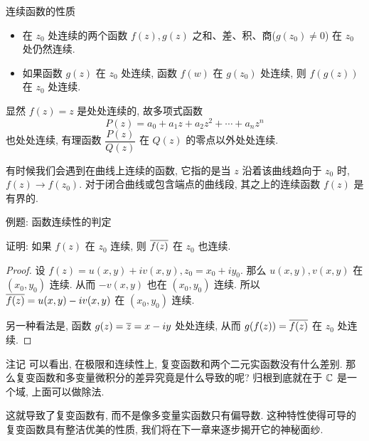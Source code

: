 \begin{frame}{连续函数的性质}
\begin{theorem}
\begin{itemize}
\item 在 $z_0$ 处连续的两个函数 $f(z),g(z)$ 之和、差、积、商($g(z_0)\neq 0$) 在 $z_0$ 处仍然连续.
\item 如果函数 $g(z)$ 在 $z_0$ 处连续, 函数 $f(w)$ 在 $g(z_0)$ 处连续, 则 $f(g(z))$ 在 $z_0$ 处连续.
\end{itemize}
\end{theorem}

\onslide<+->
显然 $f(z)=z$ 是处处连续的,
\onslide<+->
故多项式函数
\[P(z)=a_0+a_1z+a_2z^2+\cdots+a_nz^n\]
也处处连续,
\onslide<+->
有理函数 $\dfrac{P(z)}{Q(z)}$ 在 $Q(z)$ 的零点以外处处连续.

\onslide<+->
有时候我们会遇到在曲线上连续的函数, 它指的是当 $z$ 沿着该曲线趋向于 $z_0$ 时, $f(z)\to f(z_0)$.
\onslide<+->
对于闭合曲线或包含端点的曲线段, 其之上的连续函数 $f(z)$ 是有界的.
\end{frame}


\begin{frame}{例题: 函数连续性的判定}
\begin{example}
证明: 如果 $f(z)$ 在 $z_0$ 连续, 则 $\overline{f(z)}$ 在 $z_0$ 也连续.
\end{example}
\begin{proof}
\indent
设 $f(z)=u(x,y)+iv(x,y),z_0=x_0+iy_0$.
\onslide<+->
那么 $u(x,y),v(x,y)$ 在 $(x_0,y_0)$ 连续.
\onslide<+->
从而 $-v(x,y)$ 也在 $(x_0,y_0)$ 连续.
\onslide<+->
所以 $\overline{f(z)}=u(x,y)-iv(x,y)$ 在 $(x_0,y_0)$ 连续.

\indent
\onslide<+->
另一种看法是, 函数 $g(z)=\overline z=x-iy$ 处处连续,
\onslide<+->
从而 $g(f(z))=\overline{f(z)}$ 在 $z_0$ 处连续.
\end{proof}
\end{frame}


\begin{frame}{注记}
\onslide<+->
可以看出, 在极限和连续性上, 复变函数和两个二元实函数没有什么差别.
\onslide<+->
那么复变函数和多变量微积分的差异究竟是什么导致的呢?
\onslide<+->
归根到底就在于 ${\mathbb{C}}$ 是一个域, 上面可以做除法.

\onslide<+->
这就导致了复变函数有, 而不是像多变量实函数只有偏导数.
\onslide<+->
这种特性使得可导的复变函数具有整洁优美的性质, 我们将在下一章来逐步揭开它的神秘面纱.
\end{frame}


